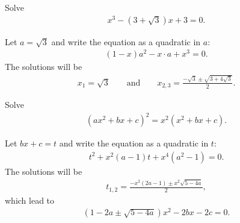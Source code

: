 \begin{tcolorbox}
\begin{question}
Solve
\begin{align*}
    x^3 - (3+\sqrt{3})x + 3 = 0.
\end{align*}
\end{question}
\end{tcolorbox}

\begin{solution}[name=Solution by Parviz Shahriari]
Let $a= \sqrt 3$ and write the equation as a quadratic in $a$:
\begin{align*}
    (1-x)a^2 - x \cdot a + x^3 =0.
\end{align*}
The solutions will be
\begin{align*}
    x_1 = \sqrt{3} \qquad \text{and} \qquad x_{2,3} = \frac{-\sqrt{3}\pm \sqrt{3+4\sqrt{3}}}{2}.
\end{align*}
\end{solution}




\begin{tcolorbox}
\begin{question}
Solve
\begin{align*}
    (ax^2+bx+c)^2 = x^2(x^2+bx+c).
\end{align*}
\end{question}
\end{tcolorbox}

\begin{solution}[name=Solution by Parviz Shahriari]
Let $bx+c= t$ and write the equation as a quadratic in $t$:
\begin{align*}
    t^2+x^2(a-1)t+x^4(a^2-1)=0.
\end{align*}
The solutions will be
\begin{align*}
    t_{1,2} = \frac{-x^2(2a-1)\pm x^2\sqrt{5-4a}}{2},
\end{align*}
which lead to
\begin{align*}
    (1 - 2a \pm \sqrt{5-4a})x^2-2bx-2c=0.
\end{align*}
\end{solution}

